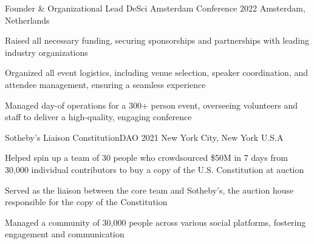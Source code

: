 \begin{cventries}
  \cventry
    {Founder \& Organizational Lead} %
    {DeSci Amsterdam Conference} %
    {2022} %
    {Amsterdam, Netherlands} %
    {
      \begin{cvitems} %
        \item Raised all necessary funding, securing sponsorships and partnerships with leading industry organizations
        \item Organized all event logistics, including venue selection, speaker coordination, and attendee management, ensuring a seamless experience
        \item Managed day-of operations for a 300+ person event, overseeing volunteers and staff to deliver a high-quality, engaging conference
      \end{cvitems}
    }

  \cventry
    {Sotheby's Liaison} %
    {ConstitutionDAO} %
    {2021} %
    {New York City, New York U.S.A} %
    {
      \begin{cvitems} %
        \item Helped spin up a team of 30 people who crowdsourced \$50M in 7 days from 30,000 individual contributors to buy a copy of the U.S. Constitution at auction
        \item Served as the liaison between the core team and Sotheby's, the auction house responsible for the copy of the Constitution
        \item Managed a community of 30,000 people across various social platforms, fostering engagement and communication
      \end{cvitems}
    }

\end{cventries}
